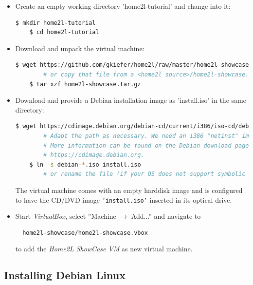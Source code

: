 \documentclass[12pt,english,parskip=half]{scrreprt}
\begin{document}
\begin{itemize}[$\blacktriangleright$]
\item
  Create an empty working directory 'home2l-tutorial' and change into it:

  \begin{lstlisting}[language=bash]
    $ mkdir home2l-tutorial
    $ cd home2l-tutorial
  \end{lstlisting}

\item
  Download and unpack the virtual machine:

  \begin{lstlisting}[language=bash]
    $ wget https://github.com/gkiefer/home2l/raw/master/home2l-showcase.tar.gz
        # or copy that file from a <home2l source>/home2l-showcase.tar.gz
    $ tar xzf home2l-showcase.tar.gz
  \end{lstlisting}

\item
  Download and provide a Debian installation image as 'install.iso' in the same directory:

  \begin{lstlisting}[language=bash]
    $ wget https://cdimage.debian.org/debian-cd/current/i386/iso-cd/debian-9.6.0-i386-netinst.iso
        # Adapt the path as necessary. We need an i386 "netinst" image.
        # More information can be found on the Debian download page at
        # https://cdimage.debian.org.
    $ ln -s debian-*.iso install.iso
        # or rename the file (if your OS does not support symbolic links)
  \end{lstlisting}

  The virtual machine comes with an empty harddisk image and is configured
  to have the CD/DVD image \texttt{'install.iso'} inserted in its optical drive.

\item
  Start \textit{VirtualBox}, select ''Machine $\rightarrow$ Add...'' and navigate to
  \begin{lstlisting}
  home2l-showcase/home2l-showcase.vbox
  \end{lstlisting}
  to add the \textit{Home2L ShowCase VM} as new virtual machine.
\end{itemize}



\subsection{Installing Debian Linux}
\label{sec:tutorial-vm-debian}
\end{document}
